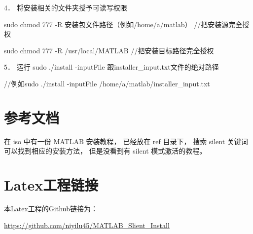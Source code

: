 \documentclass[UTF8]{article}   %
\numberwithin{equation}{section} %
\begin{document}
4．    将安装相关的文件夹授予可读写权限

sudo chmod 777 -R 安装包文件路径（例如/home/a/matlab） //把安装源完全授权

sudo chmod 777 -R /usr/local/MATLAB //把安装目标路径完全授权

5．    运行 sudo ./install -inputFile 跟installer_input.txt文件的绝对路径

//例如sudo ./install -inputFile /home/a/matlab/installer_input.txt

\section{参考文档}
\label{Sec 参考文档}
在 iso 中有一份 MATLAB 安装教程，
已经放在 ref 目录下，
搜索 silent 关键词可以找到相应的安装方法，
但是没看到有 silent 模式激活的教程。

\section{Latex工程链接}
\label{Sec Latex工程链接}
本Latex工程的Github链接为：

\href{https://github.com/niyilu45/MATLAB_Slient_Install}{https://github.com/niyilu45/MATLAB_Slient_Install}
\end{document}

